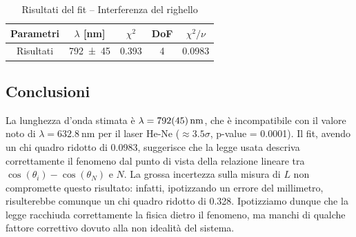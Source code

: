 \documentclass[a4paper]{article}
\begin{document}
\begin{table}[htbp]
\caption{Risultati del fit -- Interferenza del righello}
\label{tab:interferenza-righello-risultati}
\centering
\begin{tabular}{ccccc}
\toprule
Parametri & $\lambda$ [\si{\nano\meter}] & $\chi^2$ & DoF & $\chi^2/\nu$ \\
\midrule
Risultati & \num{792 \pm 45} & \num{0.393} & 4 & \num{0.0983} \\
\bottomrule
\end{tabular}
\end{table}

\subsection{Conclusioni}
La lunghezza d'onda stimata è $\lambda = \SI{792 \pm 45}{\nano\meter}$, che è incompatibile con il valore noto di $\lambda = \SI{632.8}{\nano\meter}$ per il laser He-Ne ($\approx \num{3.5}\sigma$, p-value = \num{0.0001}). Il fit, avendo un chi quadro ridotto di \num{0,0983}, suggerisce che la legge usata descriva correttamente il fenomeno dal punto di vista della relazione lineare tra $\cos(\theta_i) - \cos(\theta_N)$ e $N$. La grossa incertezza sulla misura di $L$ non compromette questo risultato: infatti, ipotizzando un errore del millimetro, risulterebbe comunque un chi quadro ridotto di \num{0.328}. Ipotizziamo dunque che la legge racchiuda correttamente la fisica dietro il fenomeno, ma manchi di qualche fattore correttivo dovuto alla non idealità del sistema.
\end{document}
